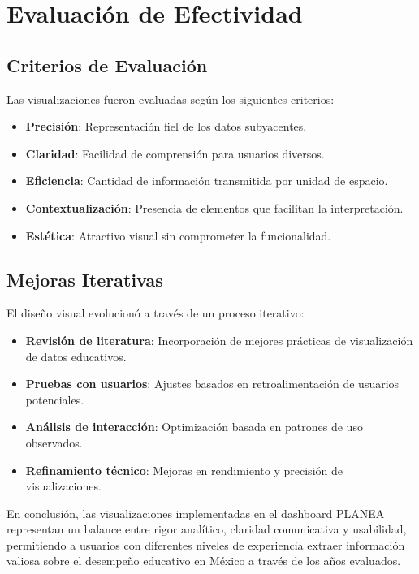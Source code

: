 \section{Evaluación de Efectividad}

\subsection{Criterios de Evaluación}
Las visualizaciones fueron evaluadas según los siguientes criterios:

\begin{itemize}
    \item \textbf{Precisión}: Representación fiel de los datos subyacentes.
    \item \textbf{Claridad}: Facilidad de comprensión para usuarios diversos.
    \item \textbf{Eficiencia}: Cantidad de información transmitida por unidad de espacio.
    \item \textbf{Contextualización}: Presencia de elementos que facilitan la interpretación.
    \item \textbf{Estética}: Atractivo visual sin comprometer la funcionalidad.
\end{itemize}

\subsection{Mejoras Iterativas}
El diseño visual evolucionó a través de un proceso iterativo:

\begin{itemize}
    \item \textbf{Revisión de literatura}: Incorporación de mejores prácticas de visualización de datos educativos.
    \item \textbf{Pruebas con usuarios}: Ajustes basados en retroalimentación de usuarios potenciales.
    \item \textbf{Análisis de interacción}: Optimización basada en patrones de uso observados.
    \item \textbf{Refinamiento técnico}: Mejoras en rendimiento y precisión de visualizaciones.
\end{itemize}

En conclusión, las visualizaciones implementadas en el dashboard PLANEA representan un balance entre rigor analítico, claridad comunicativa y usabilidad, permitiendo a usuarios con diferentes niveles de experiencia extraer información valiosa sobre el desempeño educativo en México a través de los años evaluados.
